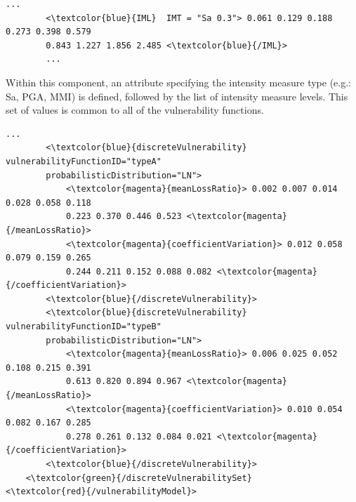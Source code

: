 \begin{Verbatim}[frame=single, commandchars=\\\{\}, samepage=true]
    ...
        <\textcolor{blue}{IML}  IMT = "Sa 0.3"> 0.061 0.129 0.188 0.273 0.398 0.579 
        0.843 1.227 1.856 2.485 <\textcolor{blue}{/IML}>
        ...
\end{Verbatim}

Within this component, an attribute specifying the intensity measure type (e.g.: Sa, PGA, MMI) is defined, followed by the list of intensity measure levels. This set of values is common to all of the vulnerability functions.

\begin{Verbatim}[frame=single, commandchars=\\\{\}, samepage=true]
        ...
        <\textcolor{blue}{discreteVulnerability}  vulnerabilityFunctionID="typeA" 
        probabilisticDistribution="LN">
            <\textcolor{magenta}{meanLossRatio}> 0.002 0.007 0.014 0.028 0.058 0.118
            0.223 0.370 0.446 0.523 <\textcolor{magenta}{/meanLossRatio}>
            <\textcolor{magenta}{coefficientVariation}> 0.012 0.058 0.079 0.159 0.265 
            0.244 0.211 0.152 0.088 0.082 <\textcolor{magenta}{/coefficientVariation}>
        <\textcolor{blue}{/discreteVulnerability}>
        <\textcolor{blue}{discreteVulnerability}  vulnerabilityFunctionID="typeB" 
        probabilisticDistribution="LN">
            <\textcolor{magenta}{meanLossRatio}> 0.006 0.025 0.052 0.108 0.215 0.391	
            0.613 0.820 0.894 0.967 <\textcolor{magenta}{/meanLossRatio}>
            <\textcolor{magenta}{coefficientVariation}> 0.010 0.054 0.082 0.167 0.285 
            0.278 0.261 0.132 0.084 0.021 <\textcolor{magenta}{/coefficientVariation}>
        <\textcolor{blue}{/discreteVulnerability}>
    <\textcolor{green}{/discreteVulnerabilitySet} 
<\textcolor{red}{/vulnerabilityModel}>        
\end{Verbatim}


